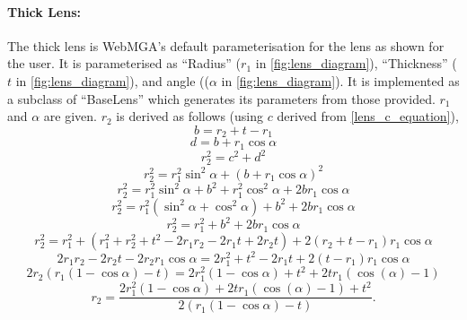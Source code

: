 \paragraph{Thick Lens:}
The thick lens is WebMGA's default parameterisation for the lens as shown for the user. It is parameterised as ``Radius'' ($r_1$ in \cref{fig:lens_diagram}), ``Thickness'' ($t$ in \cref{fig:lens_diagram}), and angle (($\alpha$ in \cref{fig:lens_diagram}). It is implemented as a subclass of ``BaseLens'' which generates its parameters from those provided. $r_1$ and $\alpha$ are given. $r_2$ is derived as follows (using $c$ derived from \cref{lens_c_equation}),
\begin{equation}
b= r_2+t-r_1
\end{equation}
\begin{equation}
d=b+r_1\cos\alpha
\end{equation}
\begin{equation}
r_2^2=c^2+d^2
\end{equation}
\begin{equation}
r_2^2=r_1^2\sin^2\alpha+(b+r_1\cos\alpha)^2
\end{equation}
\begin{equation}
r_2^2=r_1^2\sin^2\alpha+b^2+r_1^2\cos^2\alpha + 2br_1\cos\alpha
\end{equation}
\begin{equation}
r_2^2=r_1^2(\sin^2\alpha+\cos^2\alpha)+b^2 + 2br_1\cos\alpha
\end{equation}
\begin{equation}
r_2^2=r_1^2+b^2+ 2br_1\cos\alpha
\end{equation}
\begin{equation}
r_2^2=r_1^2+(r_1^2+r_2^2+t^2-2r_1r_2-2r_1t+2r_2t) + 2(r_2+t-r_1)r_1\cos\alpha
\end{equation}
\begin{equation}
2r_1r_2-2r_2t-2r_2r_1\cos\alpha=2r_1^2+t^2-2r_1t + 2(t-r_1)r_1\cos\alpha
\end{equation}
\begin{equation}
2r_2(r_1(1-\cos\alpha)-t)=2r_1^2(1-\cos\alpha)+t^2+2tr_1(\cos(\alpha)-1)
\end{equation}
\begin{equation}
r_2=\frac{2r_1^2(1-\cos\alpha)+2tr_1(\cos(\alpha)-1)+t^2}{2(r_1(1-\cos\alpha)-t)}.
\end{equation}


